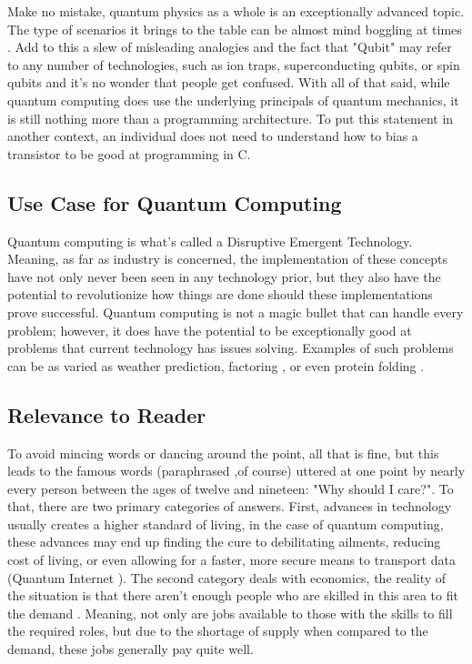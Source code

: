 \documentclass[a4paper]{article}
\begin{document}

Make no mistake, quantum physics as a whole is an exceptionally advanced topic.  The type of scenarios it brings to the table can be almost mind boggling at times \cite{mindBoggle}.  Add to this a slew of misleading analogies and the fact that "Qubit" may refer to any number of technologies, such as ion traps, superconducting qubits, or spin qubits and it's no wonder that people get confused.   With all of that said, while quantum computing does use the underlying principals of quantum mechanics, it is still nothing more than a programming architecture.  To put this statement in another context, an individual does not need to understand how to bias a transistor to be good at programming in C.

\subsection{Use Case for Quantum Computing} 
Quantum computing is what's called a Disruptive Emergent Technology.  Meaning, as far as industry is concerned, the implementation of these concepts have not only never been seen in any technology prior, but they also have the potential to revolutionize how things are done should these implementations prove successful.  Quantum computing is not a magic bullet that can handle every problem; however, it does have the potential to be exceptionally good at problems that current technology has issues solving.  Examples of such problems can be as varied as weather prediction, factoring \cite{shorsAlgorithm}, or even protein folding \cite{dwavepfold}. 

\subsection{Relevance to Reader} %
To avoid mincing words or dancing around the point, all that is fine, but this leads to the famous words (paraphrased ,of course) uttered at one point by nearly every person between the ages of twelve and nineteen: "Why should I care?".  To that, there are two primary categories of answers.  First, advances in technology usually creates a higher standard of living, in the case of quantum computing, these advances may end up finding the cure to debilitating ailments, reducing cost of living, or even allowing for a faster, more secure means to transport data (Quantum Internet \cite{qinternetNature}).  The second category deals with economics, the reality of the situation is that there aren't enough people who are skilled in this area to fit the demand \cite{qc5ycommercialize}.  Meaning, not only are jobs available to those with the skills to fill the required roles, but due to the shortage of supply when compared to the demand, these jobs generally pay quite well. 
\end{document}

